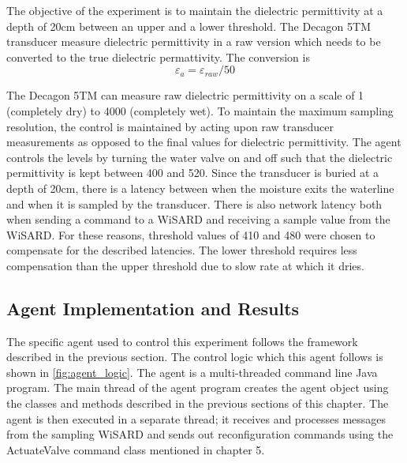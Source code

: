 The objective of the experiment is to maintain the dielectric permittivity at a depth of 20cm between an upper and a lower threshold. The Decagon 5TM transducer measure dielectric permittivity in a raw version which needs to be converted to the true dielectric permattivity. The conversion is \[ \varepsilon_{a} = \varepsilon_{raw} / 50 \] 

The Decagon 5TM can measure raw dielectric permittivity on a scale of 1 (completely dry) to 4000 (completely wet). To maintain the maximum sampling resolution, the control is maintained by acting upon raw transducer measurements as opposed to the final values for dielectric permittivity. The agent controls the levels by turning the water valve on and off such that the dielectric permittivity is kept between 400 and 520. Since the transducer is buried at a depth of 20cm, there is a latency between when the moisture exits the waterline and when it is sampled by the transducer. There is also network latency both when sending a command to a WiSARD and receiving a sample value from the WiSARD. For these reasons, threshold values of 410 and 480 were chosen to compensate for the described latencies. The lower threshold requires less compensation than the upper threshold due to slow rate at which it dries. 

\subsection{Agent Implementation and Results}
The specific agent used to control this experiment follows the framework described in the previous section. The control logic which this agent follows is shown in \ref{fig:agent_logic}. The agent is a multi-threaded command line Java program. The main thread of the agent program creates the agent object using the classes and methods described in the previous sections of this chapter. The agent is then executed in a separate thread; it receives and processes messages from the sampling WiSARD and sends out reconfiguration commands using the ActuateValve command class mentioned in chapter 5.

